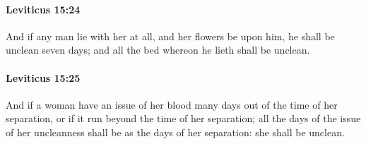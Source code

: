		\paragraph{Leviticus 15:24} %
			\label{LEVITICUS-15-24}

			And if any man lie with her at all, and her flowers be upon him, he shall be unclean seven days; and all the bed whereon he lieth shall be unclean.


		\paragraph{Leviticus 15:25} %
			\label{LEVITICUS-15-25}

			And if a woman have an issue of her blood many days out of the time of her separation, or if it run beyond the time of her separation; all the days of the issue of her uncleanness shall be as the days of her separation: she shall be unclean.

